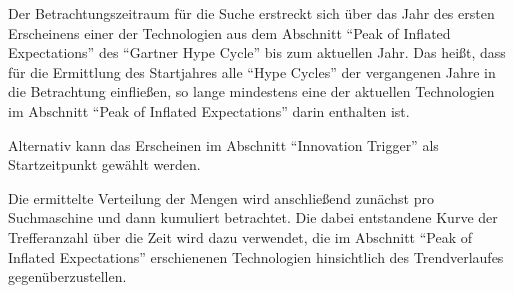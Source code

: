 Der Betrachtungszeitraum für die Suche erstreckt sich über das Jahr des ersten Erscheinens einer der Technologien aus dem Abschnitt "`Peak of Inflated Expectations"' des "`Gartner Hype Cycle"' bis zum aktuellen Jahr. Das heißt, dass für die Ermittlung des Startjahres alle "`Hype Cycles"' der vergangenen Jahre in die Betrachtung einfließen, so lange mindestens eine der aktuellen Technologien im Abschnitt "`Peak of Inflated Expectations"' darin enthalten ist.

Alternativ kann das Erscheinen im Abschnitt "`Innovation Trigger"' als Startzeitpunkt gewählt werden.

Die ermittelte Verteilung der Mengen wird anschließend zunächst pro Suchmaschine und dann kumuliert betrachtet. Die dabei entstandene Kurve der Trefferanzahl über die Zeit wird dazu verwendet, die im Abschnitt "`Peak of Inflated Expectations"' erschienenen Technologien hinsichtlich des Trendverlaufes gegenüberzustellen.